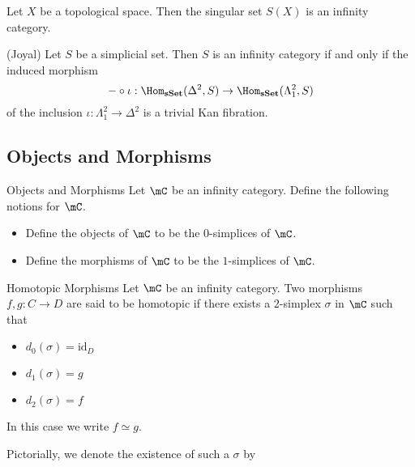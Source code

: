 \documentclass[a4paper]{article}
\begin{document}
\begin{lmm}{}{} Let $X$ be a topological space. Then the singular set $S(X)$ is an infinity category. 
\end{lmm}

\begin{thm}{(Joyal)}{} Let $S$ be a simplicial set. Then $S$ is an infinity category if and only if the induced morphism $$-\circ\iota:\Hom_\bold{sSet}(\Delta^2,S)\to\Hom_\bold{sSet}(\Lambda_1^2,S)$$ of the inclusion $\iota:\Lambda_1^2\to\Delta^2$ is a trivial Kan fibration. 
\end{thm}

\subsection{Objects and Morphisms}
\begin{defn}{Objects and Morphisms}{} Let $\mC$ be an infinity category. Define the following notions for $\mC$. 
\begin{itemize}
\item Define the objects of $\mC$ to be the $0$-simplices of $\mC$. 
\item Define the morphisms of $\mC$ to be the $1$-simplices of $\mC$. 
\end{itemize}
\end{defn}

\begin{defn}{Homotopic Morphisms}{} Let $\mC$ be an infinity category. Two morphisms $f,g:C\to D$ are said to be homotopic if there exists a $2$-simplex $\sigma$ in $\mC$ such that 
\begin{itemize}
\item $d_0(\sigma)=\text{id}_D$
\item $d_1(\sigma)=g$
\item $d_2(\sigma)=f$
\end{itemize}
In this case we write $f\simeq g$. 
\end{defn}

Pictorially, we denote the existence of such a $\sigma$ by \\~\\
\\~\\
\end{document}
